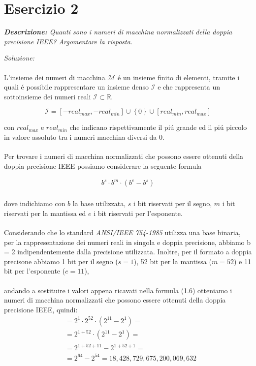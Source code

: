 \section{Esercizio 2}
\textit{\textbf{Descrizione:} Quanti sono i numeri di macchina normalizzati della doppia precisione IEEE? Argomentare la risposta.}\newline

\emph{Soluzione: }\\~\\
\noindent L'insieme dei numeri di macchina $\mathcal{M}$ \'e un insieme finito di elementi, tramite i quali \'e possibile rappresentare un insieme denso $\mathcal{I}$ e che rappresenta un sottoinsieme dei numeri reali  $\mathcal{I} \subset \mathbb{R}$.

\begin{equation}
	 \mathcal{I} = \left [ -real_{max}, -real_{min}\right ] \cup \left \{  0\right \} \cup \left [real_{min}, real_{max} \right]
\end{equation}

\noindent con $real_{max}$ e $real_{min}$ che indicano rispettivamente il pi\'u grande ed il pi\'u piccolo in valore assoluto tra i numeri macchina diversi da 0.
\\~\\
\noindent Per trovare i numeri di macchina normalizzati che possono essere ottenuti della doppia precisione IEEE possiamo considerare la seguente formula


\begin{equation}
  \begin{aligned}
      b^{s} \cdot b^{m} \cdot (b^{e} - b^{s})\\
  \end{aligned}
\end{equation}

\noindent dove indichiamo con $b$ la base utilizzata, $s$ i bit riservati per il segno, $m$ i bit riservati per la mantissa ed $e$ i bit riservati per l'esponente.
\\~\\
Considerando che lo standard \textit{ANSI/IEEE 754-1985} utilizza una base binaria, per la rappresentazione dei numeri reali in singola e doppia precisione, abbiamo b = 2 indipendentemente dalla precisione utilizzata. Inoltre, per il formato a doppia precisone abbiamo 1 bit per il segno ($s=1$), 52 bit per la mantissa ($m=52$) e 11 bit per l'esponente ($e=11$),
\\~\\
andando a sostituire i valori appena ricavati nella formula (1.6) otteniamo i numeri di macchina normalizzati che possono essere ottenuti della doppia precisione IEEE, quindi:
\begin{equation}
  \begin{aligned}
      & =  2^{1} \cdot 2^{52} \cdot (2^{11} - 2^{1}) = \\
      & = 2^{1+52} \cdot (2^{11} - 2^{1}) = \\
      & = 2^{1+52+11} - 2^{1+52+1} = \\
      & = 2^{64} - 2^{54} = 18,428,729,675,200,069,632 
  \end{aligned}
\end{equation}
\newpage